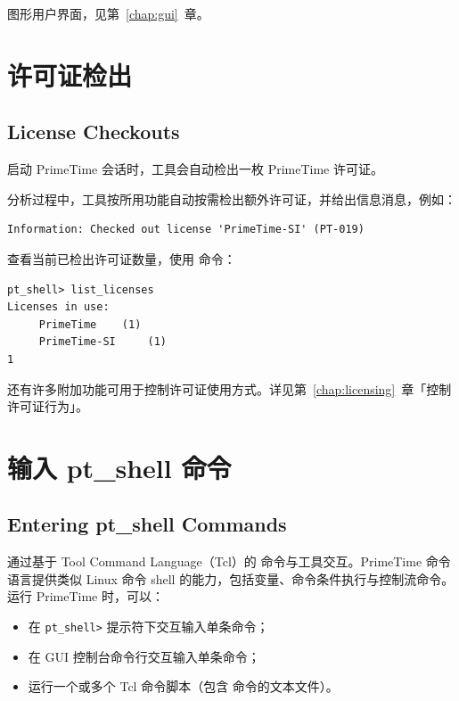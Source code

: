 
\begin{seeAlsoBox}
图形用户界面，见第~\ref{chap:gui}~章。
\end{seeAlsoBox}

\section{许可证检出}
\subsection*{License Checkouts}

启动 PrimeTime 会话时，工具会自动检出一枚 PrimeTime 许可证。

分析过程中，工具按所用功能自动按需检出额外许可证，并给出信息消息，例如：
\begin{lstlisting}
Information: Checked out license 'PrimeTime-SI' (PT-019)
\end{lstlisting}

查看当前已检出许可证数量，使用  命令：
\begin{lstlisting}
pt_shell> list_licenses
Licenses in use:
     PrimeTime    (1)
     PrimeTime-SI     (1)
1
\end{lstlisting}

还有许多附加功能可用于控制许可证使用方式。详见第~\ref{chap:licensing}~章「控制许可证行为」。

\section{输入 pt\_shell 命令}
\subsection*{Entering pt\_shell Commands}

通过基于 Tool Command Language（Tcl）的  命令与工具交互。PrimeTime 命令语言提供类似 Linux 命令 shell 的能力，包括变量、命令条件执行与控制流命令。运行 PrimeTime 时，可以：
\begin{itemize}
  \item 在 \texttt{pt\_shell>} 提示符下交互输入单条命令；
  \item 在 GUI 控制台命令行交互输入单条命令；
  \item 运行一个或多个 Tcl 命令脚本（包含  命令的文本文件）。
\end{itemize}

